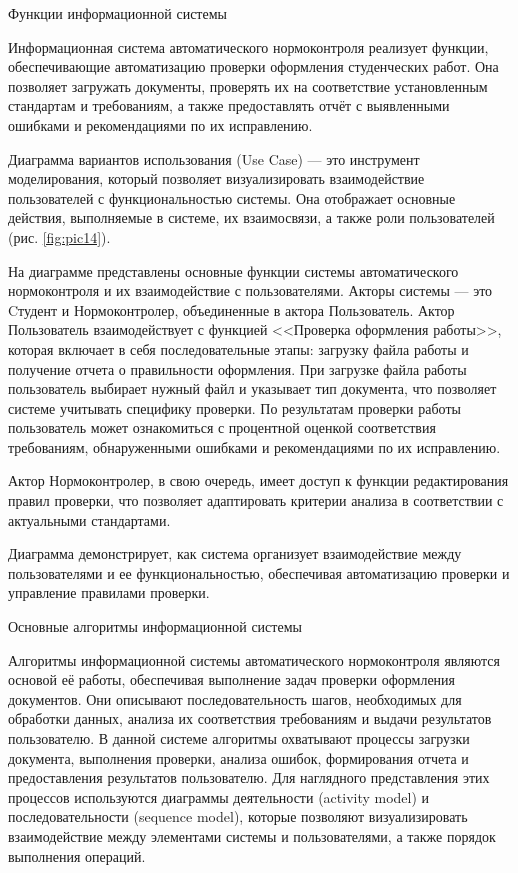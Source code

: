 \documentclass{report}
\begin{document}

Функции информационной системы

Информационная система автоматического нормоконтроля реализует функции, обеспечивающие автоматизацию проверки оформления студенческих работ. Она позволяет загружать документы, проверять их на соответствие установленным стандартам и требованиям, а также предоставлять отчёт с выявленными ошибками и рекомендациями по их исправлению.

Диаграмма вариантов использования (Use Case) --- это инструмент моделирования, который позволяет визуализировать взаимодействие пользователей с функциональностью системы. Она отображает основные действия, выполняемые в системе, их взаимосвязи, а также роли \break пользователей (рис. \ref{fig:pic14}). 


На диаграмме представлены основные функции системы автоматического нормоконтроля и их взаимодействие с пользователями. Акторы \break системы --- это Cтудент и Нормоконтролер, объединенные в актора Пользователь. Актор Пользователь взаимодействует с функцией <<Проверка оформления работы>>, которая включает в себя последовательные \break этапы: загрузку файла работы и получение отчета о правильности оформления. При загрузке файла работы пользователь выбирает нужный файл и указывает тип документа, что позволяет системе учитывать специфику проверки. По результатам проверки работы пользователь может ознакомиться с процентной оценкой соответствия требованиям, обнаруженными ошибками и рекомендациями по их исправлению. 

Актор Нормоконтролер, в свою очередь, имеет доступ к функции редактирования правил проверки, что позволяет адаптировать критерии анализа в соответствии с актуальными стандартами. 

Диаграмма демонстрирует, как система организует взаимодействие между пользователями и ее функциональностью, обеспечивая автоматизацию проверки и управление правилами проверки.



Основные алгоритмы информационной системы

Алгоритмы информационной системы автоматического нормоконтроля являются основой её работы, обеспечивая выполнение задач проверки оформления документов. Они описывают последовательность шагов, необходимых для обработки данных, анализа их соответствия требованиям и выдачи результатов пользователю. В данной системе алгоритмы охватывают процессы загрузки документа, выполнения проверки, анализа ошибок, формирования отчета и предоставления результатов пользователю. Для наглядного представления этих процессов используются диаграммы деятельности (activity model) и последовательности (sequence model), которые позволяют визуализировать взаимодействие между элементами системы и пользователями, а также порядок выполнения операций.
\end{document}
